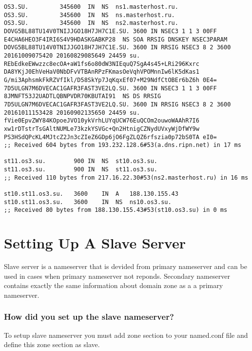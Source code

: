 \documentclass[a4paper,11pt]{article}
\begin{document}
\begin{lstlisting}[caption="Checking zone st10.st11.os3.su"]
OS3.SU.         345600  IN  NS  ns1.masterhost.ru.
OS3.SU.         345600  IN  NS  ns.masterhost.ru.
OS3.SU.         345600  IN  NS  ns2.masterhost.ru.
DOVG5BL88TU14V0TNIJJGO18H7JH7C1E.SU. 3600 IN NSEC3 1 1 3 00FF E4CHA6HEO3F4IRI6S4V9HDASKGABKP28  NS SOA RRSIG DNSKEY NSEC3PARAM
DOVG5BL88TU14V0TNIJJGO18H7JH7C1E.SU. 3600 IN RRSIG NSEC3 8 2 3600 20161009075420 20160829085649 24459 su. REbEdkeEWwzzc8ecOA+aW1fs6o80dW3NIEquQ7SgA4s45+LRi296Kxrc DA8YKjJ0EhVeHaV0NbDFvVTBAnRPzFKmasOeVqhVPOMnnIw6lK5dKas1 G/mi3AphsmkFkRZVfIkl/D58SkYp7JqKqxEf07+M29NdfCtOBEr6bZ6h 0E4=
7D5ULGN7M6DVECAC1GAFR3FAST3VE2LQ.SU. 3600 IN NSEC3 1 1 3 00FF 8JMNFT53J2UADTLQBNPVDR70KBUTAI91  NS DS RRSIG
7D5ULGN7M6DVECAC1GAFR3FAST3VE2LQ.SU. 3600 IN RRSIG NSEC3 8 2 3600 20161011153428 20160902135650 24459 su. fVie0EpvZWY84KOpoeJVO10ykVrhLUYqUCW76EuQCOm2ouwoWAAhR7I6 xw1rDTstrTsGAltNUMLe73kzkYSVGc+Qn2HtnigCZNydUVxyWjDfWY9w PS3HSdQPcKL4MJtcZ2Jn3cZIeZ6GDp6jO6FgZLQZ6rfszia0p72bS0TA eI0=
;; Received 604 bytes from 193.232.128.6#53(a.dns.ripn.net) in 17 ms

st11.os3.su.        900 IN  NS  st10.os3.su.
st11.os3.su.        900 IN  NS  st11.os3.su.
;; Received 110 bytes from 217.16.22.30#53(ns2.masterhost.ru) in 16 ms

st10.st11.os3.su.   3600    IN  A   188.130.155.43
st10.st11.os3.su.   3600    IN  NS  ns10.os3.su.
;; Received 80 bytes from 188.130.155.43#53(st10.os3.su) in 0 ms

\end{lstlisting}

\section{Setting Up A Slave Server}
\addtocounter{subsection}{5}
Slave server is a nameserver that is devided from primary nameserver and can be used in cases when primary nameserver not reponds. Secondary nameserver contains exactly the same information about domain zone as a a primary nameserver.

\subsubsection{How did you set up the slave nameserver?}
To setup slave nameserver you must add zone section to your named.conf file and define this zone section as slave.
\end{document}
